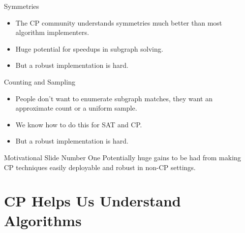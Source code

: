 \documentclass[aspectratio=169,compress,10pt]{beamer}
\begin{document}
\begin{frame}{Symmetries}
    \begin{itemize}
        \item The CP community understands symmetries much better than most algorithm implementers.
        \item Huge potential for speedups in subgraph solving.
        \item <2-> But a robust implementation is hard.
    \end{itemize}
\end{frame}

\begin{frame}{Counting and Sampling}
    \begin{itemize}
        \item People don't want to enumerate subgraph matches, they want an approximate count or
            a uniform sample.
        \item We know how to do this for SAT and CP.
        \item <2-> But a robust implementation is hard.
    \end{itemize}
\end{frame}

\begin{frame}{Motivational Slide Number One}
    Potentially huge gains to be had from making CP techniques easily
    deployable and robust in non-CP settings.
\end{frame}

\section{CP Helps Us Understand Algorithms}
\end{document}
